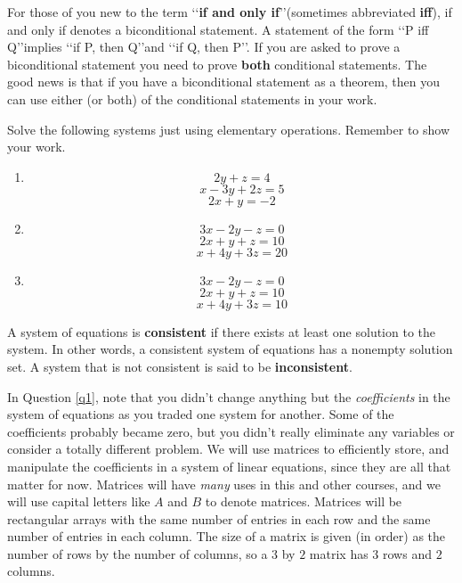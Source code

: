 
\begin{remark}
For those of you new to the term \lq\lq \textbf{if and only if}\rq\rq (sometimes abbreviated \textbf{iff}), if and only if denotes a biconditional statement. A statement of the form \lq\lq P iff Q\rq\rq implies \lq\lq if P, then Q\rq\rq and \lq\lq if Q, then P\rq\rq. If you are asked to prove a biconditional statement you need to prove \textbf{both} conditional statements. The good news is that if you have a biconditional statement as a theorem, then you can use either (or both) of the conditional statements in your work.
\end{remark}
\begin{question}\label{q1} Solve the following systems just using elementary operations. Remember to show your work.
\begin{enumerate}
\item $$ 2y+z=4$$
$$x-3y+2z=5$$
$$2x+y =-2$$
\item $$3x-2y-z=0$$
$$2x+y+z=10$$
$$x+4y+3z=20$$
\item $$3x-2y-z=0$$
$$2x+y+z=10$$
$$x+4y+3z=10$$
\end{enumerate}
\end{question}

A system of equations is \textbf{consistent} if there exists at least one solution to the system. In other words, a consistent system of equations has a nonempty solution set. A system that is not consistent is said to be \textbf{inconsistent}.

In Question \ref{q1}, note that you didn't change anything but the \emph{coefficients} in the system of equations as you traded one system for another. Some of the coefficients probably became zero, but you didn't really eliminate any variables or consider a totally different problem. We will use matrices to efficiently store, and manipulate the coefficients in a system of linear equations, since they are all that matter for now. Matrices will have \emph{many} uses in this and other courses, and we will use capital letters like $A$ and $B$ to denote matrices. Matrices will be rectangular arrays with the same number of entries in each row and the same number of entries in each column. The size of a matrix is given (in order) as the number of rows by the number of columns, so a $3$ by $2$ matrix has $3$ rows and $2$ columns.

